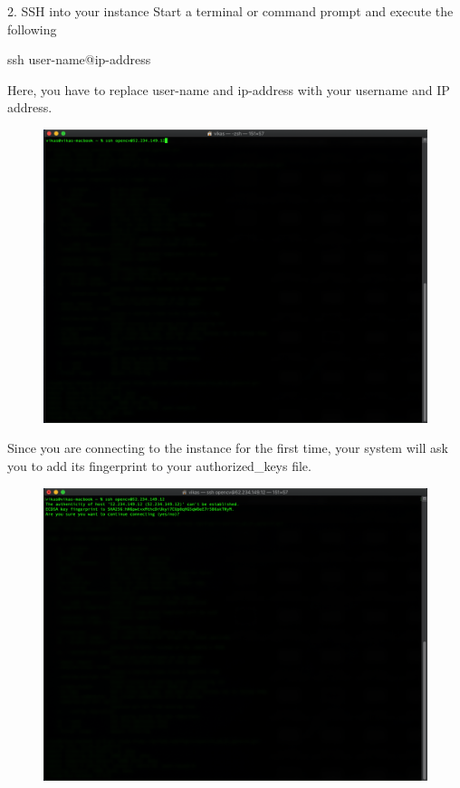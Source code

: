2. SSH into your instance
Start a terminal or command prompt and execute the following

ssh user-name@ip-address

Here, you have to replace user-name and ip-address with your username and IP address.

\begin{figure}[H]
\begin{center} 
\includegraphics[scale=0.40]{figures/ssh3}
\end{center}
\end{figure}

Since you are connecting to the instance for the first time, your system will ask you to add its fingerprint to your authorized\_keys file. 

\begin{figure}[H]
\begin{center} 
\includegraphics[scale=0.40]{figures/ssh4}
\end{center}
\end{figure}


